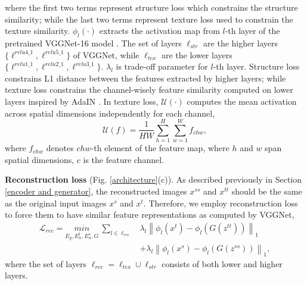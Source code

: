 \documentclass[10pt,journal,compsoc,twocolumn ]{IEEEtran}
\begin{document}
where the first two terms represent structure loss which constrains the structure similarity; while the last two terms represent texture loss used to constrain the texture similarity. $\phi_l(\cdot)$ extracts the activation map from $l$-th layer of the pretrained VGGNet-16 model \cite{simonyan2014very}. The set of layers $\ell_{str}$ are the higher layers $\{\ell^{relu4\_1}, \ell^{relu5\_1}\}$ of VGGNet, while $\ell_{tex}$ are the lower layers $\{\ell^{relu1\_1}, \ell^{relu2\_1},\ell^{relu3\_1}\}$. $\lambda_l$ is trade-off parameter for $l$-th layer. Structure loss constrains L1 distance between the features extracted by higher layers; while texture loss constrains the channel-wisely feature similarity computed on lower layers inspired by AdaIN \cite{huang2017arbitrary}. In texture loss, $\mathcal{U}(\cdot)$ computes the mean activation across spatial dimensions independently for each channel,
\begin{equation}
 \mathcal{U}\left ( f \right )=  \frac{1}{HW}\sum_{h=1}^{H}\sum_{w=1}^{W}f_{chw},
\end{equation}
where %
$f_{chw} $ denotes $chw$-th element of the feature map, where $h$ and $w$ span spatial dimensions, $c$ is the feature channel. %

\textbf{Reconstruction loss} (Fig. \ref{architecture}(c)). As described previously in Section \ref{encoder and generator}, the reconstructed images $x^{ss}$ and $x^{tt}$ should be the same as the original input images $x^s$ and $x^t$. Therefore, we employ reconstruction loss to force them to have similar feature representations as computed by VGGNet,
\begin{equation}
\begin{split}
\mathcal{L}_{rec}=\underset{E_g,E^t_n,E^s_n, G}{min} \ \sum_{l\in \ell_{rec}} &\lambda_l \left \| \phi_l\left ( x^t \right )- \phi_l\left ( G\left ( z^{tt} \right ) \right )\right \|_1\\
&+\lambda_l \left \| \phi_l\left ( x^s \right )- \phi_l\left ( G\left ( z^{ss} \right ) \right )\right \|_1, \label{rec}
\end{split}
\end{equation}
where the set of layers $\ell_{rec}=\ell_{tex}\cup \ell_{str}$ consists of both lower and higher layers. %
\end{document}
